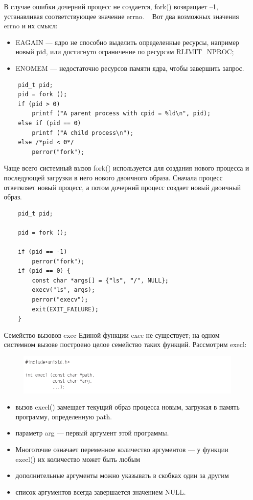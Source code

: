 \documentclass[xcolor=table]{beamer}
\begin{document}
\begin{frame}[fragile]
	В случае ошибки дочерний процесс не создается, fork() возвращает –1, устанавливая соответствующее значение errno. 
	~
	Вот два возможных значения errno и их смысл:
	\begin{itemize}
		\item EAGAIN — ядро не способно выделить определенные ресурсы, например новый pid, или достигнуто ограничение по ресурсам RLIMIT\_NPROC;
		\item ENOMEM — недостаточно ресурсов памяти ядра, чтобы завершить запрос.
	\end{itemize}
	\begin{verbatim}
	pid_t pid;        
	pid = fork ();    
	if (pid > 0)        
		printf ("A parent process with cpid = %ld\n", pid);
	else if (pid == 0)
		printf ("A child process\n");
	else /*pid < 0*/
		perror("fork");	
	\end{verbatim}
\end{frame}

\begin{frame}[fragile]
	Чаще всего системный вызов fork() используется для создания нового процесса и последующей загрузки в него нового двоичного образа.  Сначала процесс ответвляет новый процесс, а потом дочерний процесс создает новый двоичный образ.
	\begin{verbatim}
	pid_t pid;
    
	pid = fork ();
    
	if (pid == -1)
		perror("fork");
	if (pid == 0) {
		const char *args[] = {"ls", "/", NULL};
		execv("ls", args);
		perror("execv");
		exit(EXIT_FAILURE);
	}
	\end{verbatim}
\end{frame}

\begin{frame}{Семейство вызовов exec}
Единой функции exec не существует; на одном системном вызове построено целое
семейство таких функций. Рассмотрим execl:
\begin{figure}[h]
\centering
\includegraphics[scale=0.5]{images/lec07-pic04.png}
\end{figure}
\begin{itemize}
\item вызов execl() замещает текущий образ процесса новым, загружая в память
программу, определенную path. 
\item параметр arg — первый аргумент этой программы. 
\item Многоточие означает переменное количество аргументов — у функции
execl() их количество может быть любым
\item дополнительные аргументы можно указывать в скобках один за другим
\item список аргументов всегда завершается значением NULL.
\end{itemize}
\end{frame}
\end{document}

